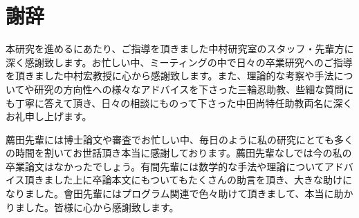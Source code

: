 \chapter{謝辞}

本研究を進めるにあたり、ご指導を頂きました中村研究室のスタッフ・先輩方に深く感謝致します。お忙しい中、ミーティングの中で日々の卒業研究へのご指導を頂きました中村宏教授に心から感謝致します。また、理論的な考察や手法についてや研究の方向性への様々なアドバイスを下さった三輪忍助教、些細な質問にも丁寧に答えて頂き、日々の相談にものって下さった中田尚特任助教両名に深くお礼申し上げます。

薦田先輩には博士論文や審査でお忙しい中、毎日のように私の研究にとても多くの時間を割いてお世話頂き本当に感謝しております。薦田先輩なしでは今の私の卒業論文はなかったでしょう。有間先輩には数学的な手法や理論についてアドバイス頂きました上に卒論本文にもついてもたくさんの助言を頂き、大きな助けになりました。會田先輩にはプログラム関連で色々助けて頂きまして、本当に助かりました。皆様に心から感謝致します。